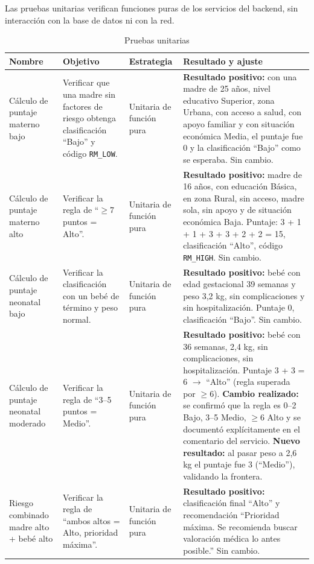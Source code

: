 \documentclass[12pt,letterpaper]{article}
\begin{document}
Las pruebas unitarias verifican funciones puras de los servicios del backend, sin interacción con la base de datos ni con la red.

\begin{longtable}{p{}p{}p{}p{}}
\caption{Pruebas unitarias}\\\toprule
\textbf{Nombre} & \textbf{Objetivo} & \textbf{Estrategia} & \textbf{Resultado y ajuste} \\\midrule
\endhead
Cálculo de puntaje materno bajo & Verificar que una madre sin factores de riesgo obtenga clasificación ``Bajo'' y código \texttt{RM\_LOW}. & Unitaria de función pura & \textbf{Resultado positivo:} con una madre de 25 años, nivel educativo Superior, zona Urbana, con acceso a salud, con apoyo familiar y con situación económica Media, el puntaje fue 0 y la clasificación ``Bajo'' como se esperaba. Sin cambio.\\\hline
Cálculo de puntaje materno alto & Verificar la regla de ``$\geq$7 puntos = Alto''. & Unitaria de función pura & \textbf{Resultado positivo:} madre de 16 años, con educación Básica, en zona Rural, sin acceso, madre sola, sin apoyo y de situación económica Baja. Puntaje: 3 + 1 + 1 + 3 + 3 + 2 + 2 = 15, clasificación ``Alto'', código \texttt{RM\_HIGH}. Sin cambio.\\\hline
Cálculo de puntaje neonatal bajo & Verificar la clasificación con un bebé de término y peso normal. & Unitaria de función pura & \textbf{Resultado positivo:} bebé con edad gestacional 39 semanas y peso 3,2 kg, sin complicaciones y sin hospitalización. Puntaje 0, clasificación ``Bajo''. Sin cambio.\\\hline
Cálculo de puntaje neonatal moderado & Verificar la regla de ``3--5 puntos = Medio''. & Unitaria de función pura & \textbf{Resultado positivo:} bebé con 36 semanas, 2,4 kg, sin complicaciones, sin hospitalización. Puntaje 3 + 3 = 6 $\to$ ``Alto'' (regla superada por $\geq$6). \textbf{Cambio realizado:} se confirmó que la regla es 0--2 Bajo, 3--5 Medio, $\geq$6 Alto y se documentó explícitamente en el comentario del servicio. \textbf{Nuevo resultado:} al pasar peso a 2,6 kg el puntaje fue 3 (``Medio''), validando la frontera.\\\hline
Riesgo combinado madre alto + bebé alto & Verificar la regla de ``ambos altos = Alto, prioridad máxima''. & Unitaria de función pura & \textbf{Resultado positivo:} clasificación final ``Alto'' y recomendación ``Prioridad máxima. Se recomienda buscar valoración médica lo antes posible.'' Sin cambio.\\\hline

\end{longtable}
\end{document}
